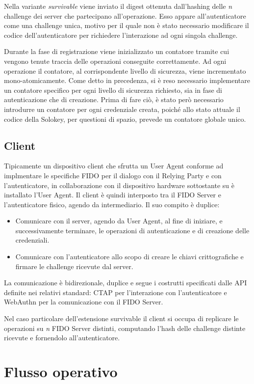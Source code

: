 Nella variante \emph{survivable} viene inviato il digest ottenuta dall'hashing delle \emph{n} challenge dei server che partecipano all'operazione. Esso appare all'autenticatore come una challenge unica, motivo per il quale non è stato necessario modificare il codice dell'autenticatore per richiedere l'interazione ad ogni singola challenge. 

Durante la fase di registrazione viene inizializzato un contatore tramite cui vengono tenute traccia delle operazioni conseguite correttamente. Ad ogni operazione il contatore, al corrispondente livello di sicurezza, viene incrementato mono-atomicamente. Come detto in precedenza, si è reso necessario implementare un contatore specifico per ogni livello di sicurezza richiesto, sia in fase di autenticazione che di creazione. Prima di fare ciò, è stato però necessario introdurre un contatore per ogni credenziale creata, poiché allo stato attuale il codice della Solokey, per questioni di spazio, prevede un contatore globale unico. 


\subsection{Client}
\label{client}

Tipicamente un dispositivo client che sfrutta un User Agent conforme ad implmentare le specifiche FIDO per il dialogo con il Relying Party e con l'autenticatore, in collaborazione con il dispositivo hardware sottostante su è installato l'User Agent. Il client è quindi interposto tra il FIDO Server e l'autenticatore fisico, agendo da intermediario. Il suo compito è duplice:
\begin{itemize}
	\item Comunicare con il server, agendo da User Agent, al fine di iniziare, e successivamente terminare, le operazioni di autenticazione e di creazione delle credenziali. 
	\item Comunicare con l'autenticatore allo scopo di creare le chiavi crittografiche e firmare le challenge ricevute dal server.
\end{itemize}
La comunicazione è bidirezionale, duplice e segue i costrutti specificati dalle API definite nei relativi standard: CTAP per l'interazione con l'autenticatore e WebAuthn per la comunicazione con il FIDO Server. 

Nel caso particolare dell'estensione survivable il client si occupa di replicare le operazioni su \emph{n} FIDO Server distinti, computando l'hash delle challenge distinte ricevute e fornendolo all'autenticatore.

\section{Flusso operativo}
\label{flusso_operativo}

